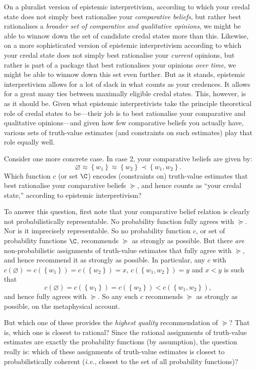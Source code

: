On a pluralist version of epistemic interpretivism, according to which your credal state does not simply best rationalise your \textit{comparative beliefs}, but rather best rationalises a \textit{broader set of comparative and qualitative opinions}, we might be able to winnow down the set of candidate credal states more than this. Likewise, on a more sophisticated version of epistemic interpretivism according to which your credal state does not simply best rationalise your \textit{current} opinions, but rather is part of a package that best rationalises your opinions \textit{over time}, we might be able to winnow down this set even further. But as it stands, epistemic interpretivism allows for a lot of slack in what counts as your credences. It allows for a great many ties between maximally eligible credal states. This, however, is as it should be. Given what epistemic interpretivists take the principle theoretical role of credal states to be---their job is to best rationalise your comparative and qualitative opinions---and given how few comparative beliefs you actually have, various sets of truth-value estimates (and constraints on such estimates) play that role equally well. 

Consider one more concrete case. In case 2, your comparative beliefs are given by:
$$ \varnothing\approx\left\{w_1\right\}\approx\left\{w_2\right\}\prec\left\{w_1,w_2\right\}. $$
Which function $c$ (or set $\C$) encodes (constraints on) truth-value estimates that best rationalise your comparative beliefs $\succeq$, and hence counts as ``your credal state,'' according to epistemic interpretivism? 

To answer this question, first note that your comparative belief relation is clearly not probabilistically representable. No probability function fully agrees with $\succeq$. Nor is it imprecisely representable. So no probability function $c$, or set of probability functions $\C$, recommends $\succeq$ as strongly as possible. But there \textit{are} non-probabilistic assignments of truth-value estimates that fully agree with $\succeq$, and hence recommend it as strongly as possible. In particular, any $c$ with $c(\varnothing)=c(\left\{w_1\right\})=c(\left\{w_2\right\})=x$, $c(\left\{w_1,w_2\right\})=y$ and $x<y$ is such that 
$$ c(\varnothing)=c(\left\{w_1\right\})=c(\left\{w_2\right\})<c(\left\{w_1,w_2\right\}), $$
and hence fully agrees with $\succeq$. So any such $c$ recommends $\succeq$ as strongly as possible, on the metaphysical account.

But which one of these provides the \textit{highest quality} recommendation of $\succeq$? That is, which one is closest to rational? Since the rational assignments of truth-value estimates are exactly the probability functions (by assumption), the question really is: which of these assignments of truth-value estimates is closest to probabilistically coherent (\textit{i.e.}, closest to the set of all probability functions)? 

